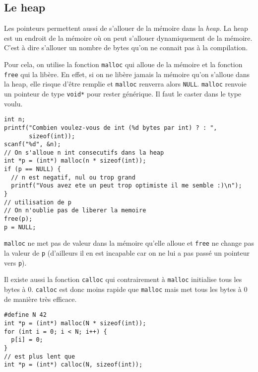 \subsection{Le heap}
Les pointeurs permettent aussi de s'allouer de la mémoire dans la \emph{heap}.
La heap est un endroit de la mémoire où on peut s'allouer dynamiquement
de la mémoire.
C'est à dire s'allouer un nombre de bytes
qu'on ne connait pas à la compilation.

Pour cela, on utilise la fonction \lstinline|malloc| qui alloue de la mémoire
et la fonction \lstinline|free| qui la libère.
En effet, si on ne libère jamais la mémoire qu'on s'alloue dans la heap,
elle risque d'être remplie et \lstinline|malloc| renverra alors
\lstinline|NULL|.
\lstinline|malloc| renvoie un pointeur de type \lstinline|void*|
pour rester générique.
Il faut le caster dans le type voulu.
\begin{lstlisting}
int n;
printf("Combien voulez-vous de int (%d bytes par int) ? : ",
       sizeof(int));
scanf("%d", &n);
// On s'alloue n int consecutifs dans la heap
int *p = (int*) malloc(n * sizeof(int));
if (p == NULL) {
  // n est negatif, nul ou trop grand
  printf("Vous avez ete un peut trop optimiste il me semble :)\n");
}
// utilisation de p
// On n'oublie pas de liberer la memoire
free(p);
p = NULL;
\end{lstlisting}

\lstinline|malloc| ne met pas de valeur dans la mémoire qu'elle alloue
et \lstinline|free| ne change pas la valeur de \lstinline|p|
(d'ailleurs il en est incapable car on ne lui a pas passé un pointeur
vers \lstinline|p|).

Il existe aussi la fonction \lstinline|calloc| qui contrairement à
\lstinline|malloc| initialise tous les bytes à 0.
\lstinline|calloc| est donc moins rapide que \lstinline|malloc| mais
met tous les bytes à 0 de manière très efficace.
\begin{lstlisting}
#define N 42
int *p = (int*) malloc(N * sizeof(int));
for (int i = 0; i < N; i++) {
  p[i] = 0;
}
// est plus lent que
int *p = (int*) calloc(N, sizeof(int));
\end{lstlisting}

